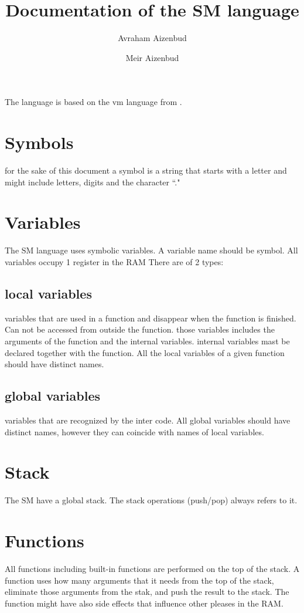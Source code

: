 \documentclass[12pt]{amsart}
\title{Documentation of the SM language}
\author{Avraham Aizenbud}
\author{Meir Aizenbud}
\begin{document}
\maketitle
The language is based on the vm language from \cite{NS}.

\section{Symbols}
for the sake of this document a symbol is a string that starts with a letter and might include letters, digits and the character ``."

\section{Variables}
The SM language uses symbolic variables. A variable name should be symbol.  All variables occupy 1 register in the RAM
There are of 2 types:

\subsection{local variables}
	variables that are used in a function and disappear when the function is finished. Can not be accessed  from outside the function.
	those variables includes the arguments of the function and the internal variables. internal variables mast be declared together with the function. All the local variables of a given function should have distinct names.

\subsection{global variables}	
	variables that are recognized by the inter code. All global variables should have distinct names, however they can coincide with names of local variables.

\section{Stack}	
The SM have a global stack. The stack operations (push/pop) always refers to it.

\section{Functions}	
All functions including built-in functions are performed on the top of the stack. A function uses how many arguments that it needs from the top of the stack, eliminate those arguments from the stak, and push the result to the stack. The function might have also side effects that influence other pleases in the RAM.
\end{document}
